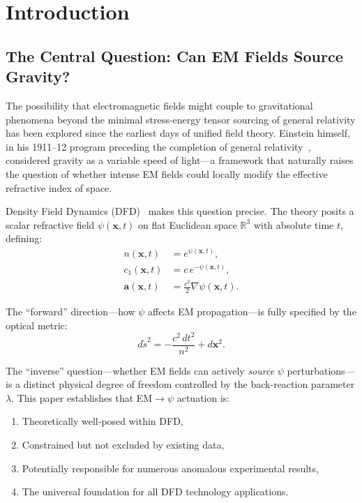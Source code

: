 \documentclass[aps,prd,twocolumn,superscriptaddress,floatfix,nofootinbib]{revtex4-2}
\newcommand{\avec}{\mathbf{a}}
\begin{document}
\section{Introduction}\label{sec:intro}

\subsection{The Central Question: Can EM Fields Source Gravity?}

The possibility that electromagnetic fields might couple to gravitational
phenomena beyond the minimal stress-energy tensor sourcing of general
relativity has been explored since the earliest days of unified field
theory. Einstein himself, in his 1911--12 program preceding the completion
of general relativity~\cite{Einstein1911,Einstein1912}, considered gravity
as a variable speed of light---a framework that naturally raises the
question of whether intense EM fields could locally modify the effective
refractive index of space.

Density Field Dynamics (DFD)~\cite{Alcock2025DFD} makes this question
precise. The theory posits a scalar refractive field $\psi(\mathbf{x},t)$
on flat Euclidean space $\mathbb{R}^3$ with absolute time $t$, defining:
\begin{align}
n(\mathbf{x},t) &= e^{\psi(\mathbf{x},t)}, \label{eq:n-def}\\
c_1(\mathbf{x},t) &= c\,e^{-\psi(\mathbf{x},t)}, \label{eq:c1-def}\\
\avec(\mathbf{x},t) &= \frac{c^2}{2}\nabla\psi(\mathbf{x},t). \label{eq:a-def}
\end{align}

The ``forward'' direction---how $\psi$ affects EM propagation---is fully
specified by the optical metric:
\begin{equation}
d\tilde{s}^2 = -\frac{c^2\,dt^2}{n^2} + d\mathbf{x}^2.
\label{eq:optical-metric}
\end{equation}

The ``inverse'' question---whether EM fields can actively \emph{source}
$\psi$ perturbations---is a distinct physical degree of freedom controlled
by the back-reaction parameter $\lambda$. This paper establishes that
EM$\to\psi$ actuation is:
\begin{enumerate}[nosep]
\item Theoretically well-posed within DFD,
\item Constrained but not excluded by existing data,
\item Potentially responsible for numerous anomalous experimental results,
\item The universal foundation for all DFD technology applications.
\end{enumerate}
\end{document}
